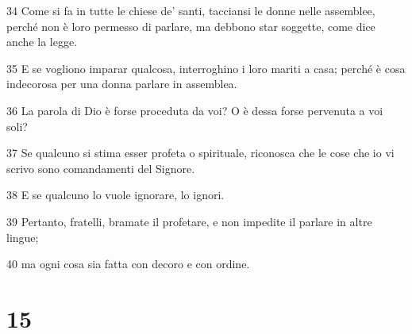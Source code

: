 \par 34 Come si fa in tutte le chiese de' santi, tacciansi le donne nelle assemblee, perché non è loro permesso di parlare, ma debbono star soggette, come dice anche la legge.
\par 35 E se vogliono imparar qualcosa, interroghino i loro mariti a casa; perché è cosa indecorosa per una donna parlare in assemblea.
\par 36 La parola di Dio è forse proceduta da voi? O è dessa forse pervenuta a voi soli?
\par 37 Se qualcuno si stima esser profeta o spirituale, riconosca che le cose che io vi scrivo sono comandamenti del Signore.
\par 38 E se qualcuno lo vuole ignorare, lo ignori.
\par 39 Pertanto, fratelli, bramate il profetare, e non impedite il parlare in altre lingue;
\par 40 ma ogni cosa sia fatta con decoro e con ordine.

\chapter{15}

